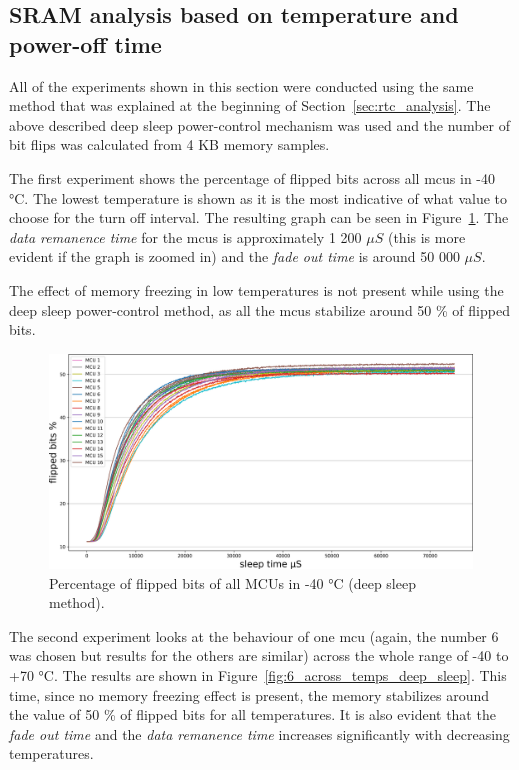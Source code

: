 \subsection{SRAM analysis based on temperature and power-off time}\label{sec:deep_sleep_analysis}

All of the experiments shown in this section were conducted using the same method that was explained at the beginning of Section~\ref{sec:rtc_analysis}. The above described deep sleep power-control mechanism was used and the number of bit flips was calculated from 4 KB memory samples.

The first experiment shows the percentage of flipped bits across all \glspl{mcu} in -40 °C. The lowest temperature is shown as it is the most indicative of what value to choose for the turn off interval. The resulting graph can be seen in Figure~\ref{fig:all_minus_40_deep_sleep}. The \emph{data remanence time} for the \glspl{mcu} is approximately 1 200 $\mu{}S$ (this is more evident if the graph is zoomed in) and the \emph{fade out time} is around 50 000 $\mu{}S$.

The effect of memory freezing in low temperatures is not present while using the deep sleep power-control method, as all the \glspl{mcu} stabilize around 50 \% of flipped bits.

\begin{figure}[ht!]
    \centering
    \captionsetup{justification=centering,margin=0.5cm}
    \includegraphics[width=\textwidth]{images/all_minus_40_deep_sleep.png}
    \caption{Percentage of flipped bits of all MCUs in -40 °C (deep sleep method).}
    \label{fig:all_minus_40_deep_sleep}
\end{figure}

The second experiment looks at the behaviour of one \gls{mcu} (again, the number 6 was chosen but results for the others are similar) across the whole range of -40 to +70 °C. The results are shown in Figure~\ref{fig:6_across_temps_deep_sleep}. This time, since no memory freezing effect is present, the memory stabilizes around the value of 50 \% of flipped bits for all temperatures. It is also evident that the \emph{fade out time} and the \emph{data remanence time} increases significantly with decreasing temperatures.

